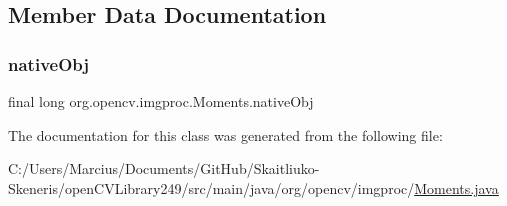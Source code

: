 \subsection{Member Data Documentation}
\mbox{\label{classorg_1_1opencv_1_1imgproc_1_1_moments_a5570a42e49c8c53cbd70457e28b80f3c}} 
\subsubsection{\texorpdfstring{native\+Obj}{nativeObj}}
{\footnotesize\ttfamily final long org.\+opencv.\+imgproc.\+Moments.\+native\+Obj\hspace{0.3cm}{\ttfamily [protected]}}



The documentation for this class was generated from the following file\+:\begin{DoxyCompactItemize}
\item 
C\+:/\+Users/\+Marcius/\+Documents/\+Git\+Hub/\+Skaitliuko-\/\+Skeneris/open\+C\+V\+Library249/src/main/java/org/opencv/imgproc/\mbox{\hyperlink{_moments_8java}{Moments.\+java}}\end{DoxyCompactItemize}
